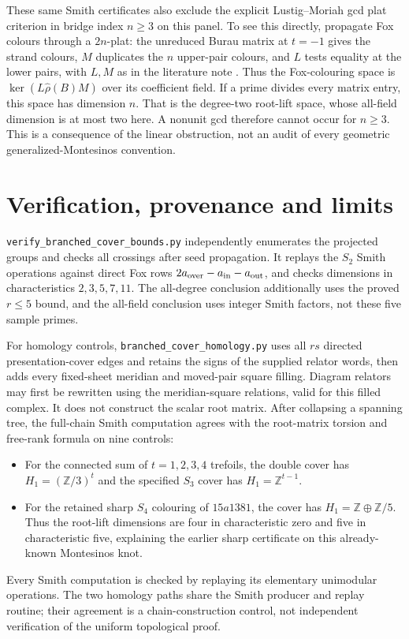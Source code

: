 \documentclass[11pt]{article}
\newcommand{\Z}{\mathbb Z}
\begin{document}
These same Smith certificates also exclude the explicit
Lustig--Moriah gcd plat criterion in bridge index $n\ge3$ on this
panel. To see this directly, propagate Fox colours through a
$2n$-plat: the unreduced Burau matrix at $t=-1$ gives the strand
colours, $M$ duplicates the $n$ upper-pair colours, and $L$ tests
equality at the lower pairs, with $L,M$ as in the literature note
\cite{moriah}. Thus the Fox-colouring space is
$\ker(L\widehat\rho(B)M)$ over its coefficient field. If a prime
divides every matrix entry, this space has dimension $n$. That is
the degree-two root-lift space, whose all-field dimension is at most
two here. A nonunit gcd therefore cannot occur for $n\ge3$.
This is a consequence of the linear obstruction, not an audit of
every geometric generalized-Montesinos convention.

\section{Verification, provenance and limits}

\texttt{verify\_branched\_cover\_bounds.py} independently enumerates
the projected groups and checks all crossings after seed propagation.
It replays the $S_2$ Smith operations against direct Fox rows
$2a_{\rm over}-a_{\rm in}-a_{\rm out}$, and checks dimensions in
characteristics $2,3,5,7,11$. The all-degree conclusion additionally
uses the proved $r\le5$ bound, and the all-field conclusion uses
integer Smith factors, not these five sample primes.

For homology controls, \texttt{branched\_cover\_homology.py} uses all
$rs$ directed presentation-cover edges and retains the signs of the
supplied relator words, then adds every fixed-sheet meridian and
moved-pair square filling. Diagram relators may first be rewritten
using the meridian-square relations, valid for this filled complex.
It does not construct the scalar root matrix. After collapsing
a spanning tree, the full-chain Smith computation agrees with the
root-matrix torsion and free-rank formula on nine controls:
\begin{itemize}
\item For the connected sum of $t=1,2,3,4$ trefoils, the double cover
has $H_1=(\Z/3)^t$ and the specified $S_3$ cover has
$H_1=\Z^{t-1}$.
\item For the retained sharp $S_4$ colouring of $15a1381$, the cover
has $H_1=\Z\oplus\Z/5$. Thus the root-lift dimensions are four in
characteristic zero and five in characteristic five, explaining the
earlier sharp certificate on this already-known Montesinos knot.
\end{itemize}
Every Smith computation is checked by replaying its elementary
unimodular operations. The two homology paths share the Smith producer
and replay routine; their agreement is a chain-construction control,
not independent verification of the uniform topological proof.
\end{document}
